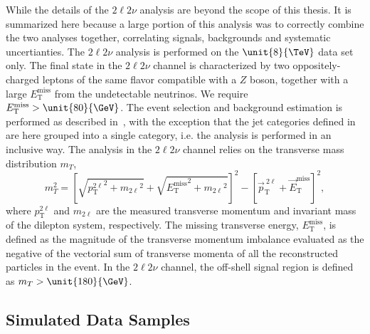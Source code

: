 While the details of the $2\ell2\nu$ analysis are beyond the scope of this thesis. It is summarized here because a large portion of this analysis was to correctly combine the two analyses together, correlating signals, backgrounds and systematic uncertianties. The $2\ell 2\nu$ analysis is performed on the $\unit{8}{\TeV}$ data set only. The final state in the $2\ell 2\nu$ channel is characterized by two oppositely-charged leptons of the same flavor
compatible with a $Z$ boson, together with a large $E_\mathrm{T}^\text{miss}$ from the undetectable neutrinos.
We require $E_\mathrm{T}^\text{miss} > \unit{80}{\GeV}$. The event selection and background estimation is performed as
described in~\cite{Chatrchyan:2013yoa}, with the exception that the jet categories defined
in \cite{Chatrchyan:2013yoa} are here grouped into a single category, i.e. the analysis
is performed in an inclusive way. The analysis in the $2\ell2\nu$ channel relies on the transverse mass distribution $m_{T}$,
\begin{equation}
m_{T}^{2} = \left[\sqrt{{p_{\mathrm{T}}^{2\ell}}^2 + {m_{2\ell}}^2} + \sqrt{{E_\mathrm{T}^\text{miss}}^2 +
{m_{2\ell}}^2}\right]^2 - \left[\vec{p}_{\mathrm{T}}^{~2\ell} + \vec{E}_\mathrm{T}^\text{miss}\right]^2 ,
\end{equation}
where $p_{\mathrm{T}}^{2\ell}$ and $m_{2\ell}$ are the measured transverse momentum and invariant mass
of the dilepton system, respectively. The missing transverse energy, $E_\mathrm{T}^\text{miss}$, is defined as
the magnitude of the transverse momentum imbalance evaluated as the negative of the vectorial sum of
transverse momenta of all the reconstructed particles in the event. In the $2\ell 2\nu$ channel,
the off-shell signal region is defined as $m_{T} > \unit{180}{\GeV}$.


\subsection{Simulated Data Samples}

